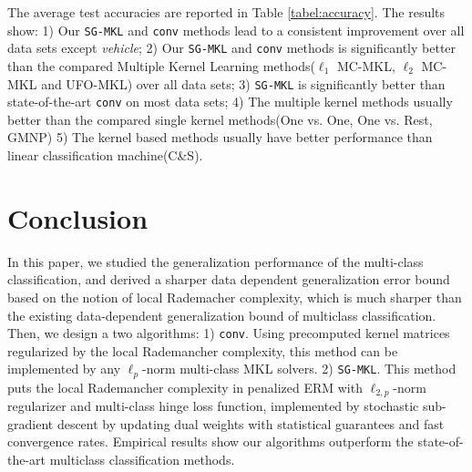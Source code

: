 \documentclass{article}
\begin{document}
The average test accuracies are reported in Table \ref{tabel:accuracy}. The results show: 1) Our \texttt{SG-MKL} and \texttt{conv} methods lead to a consistent improvement over all data sets except \textit{vehicle}; 2) Our \texttt{SG-MKL} and \texttt{conv} methods is significantly better than the compared Multiple Kernel Learning methods($\ell_1$ MC-MKL, $\ell_2$ MC-MKL and UFO-MKL) over all data sets; 3) \texttt{SG-MKL} is significantly better than state-of-the-art \texttt{conv} on most data sets; 4) The multiple kernel methods usually better than the compared single kernel methods(One vs. One, One vs. Rest, GMNP) 5) The kernel based methods usually have better performance than linear classification machine(C\&S).

\section{Conclusion}
In this paper, we studied the generalization performance of the multi-class classification, and derived a sharper data dependent generalization error bound based on the notion of local Rademacher complexity, which is much sharper than the existing data-dependent generalization bound of multiclass classification. Then, we design a two algorithms: 1) \texttt{conv}. Using precomputed kernel matrices regularized by the local Rademancher complexity, this method can be implemented by any $\ell_p$-norm multi-class MKL solvers. 2) \texttt{SG-MKL}. This method puts the local Rademancher complexity in penalized ERM with $\ell_{2,p}$-norm regularizer and multi-class hinge loss function, implemented by stochastic sub-gradient descent by updating dual weights with statistical guarantees and fast convergence rates. Empirical results show our algorithms outperform the state-of-the-art multiclass classification methods.

%
%



\end{document}
